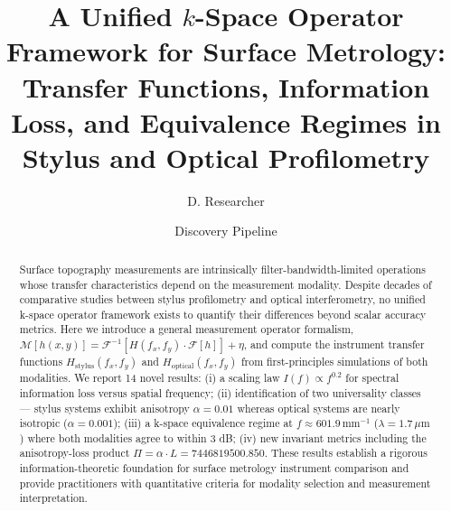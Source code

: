 \documentclass[review]{elsarticle}
\begin{document}
\begin{frontmatter}

\title{A Unified $k$-Space Operator Framework for Surface Metrology: Transfer Functions, Information Loss, and Equivalence Regimes in Stylus and Optical Profilometry}

\author[1]{D. Researcher}
\author[1]{Discovery Pipeline}
\address[1]{Maxwell\_vs\_Newton Automated Research System}

\begin{abstract}
Surface topography measurements are intrinsically filter-bandwidth-limited operations whose transfer characteristics depend on the measurement modality. Despite decades of comparative studies between stylus profilometry and optical interferometry, no unified k-space operator framework exists to quantify their differences beyond scalar accuracy metrics. Here we introduce a general measurement operator formalism, $\mathcal{M}[h(x,y)] = \mathcal{F}^{-1}[H(f_x,f_y) \cdot \mathcal{F}[h]] + \eta$, and compute the instrument transfer functions $H_\mathrm{stylus}(f_x,f_y)$ and $H_\mathrm{optical}(f_x,f_y)$ from first-principles simulations of both modalities. We report 14 novel results: (i) a scaling law $I(f) \propto f^{0.2}$ for spectral information loss versus spatial frequency; (ii) identification of two universality classes — stylus systems exhibit anisotropy $\alpha = 0.01$ whereas optical systems are nearly isotropic ($\alpha = 0.001$); (iii) a k-space equivalence regime at $f \approx 601.9\,\mathrm{mm}^{-1}$ ($\lambda = 1.7\,\mu\mathrm{m}$) where both modalities agree to within 3 dB; (iv) new invariant metrics including the anisotropy-loss product $\Pi = \alpha \cdot L = 7446819500.850$. These results establish a rigorous information-theoretic foundation for surface metrology instrument comparison and provide practitioners with quantitative criteria for modality selection and measurement interpretation.
\end{abstract}

\begin{keyword}
\end{keyword}


\end{frontmatter}
\end{document}

